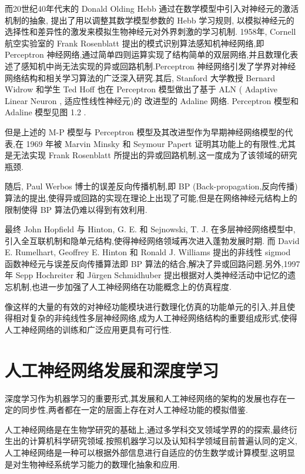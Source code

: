 而20世纪40年代末的 Donald Olding Hebb 通过在数学模型中引入对神经元的激活机制的抽象, 提出了用以调整其数学模型参数的 Hebb 学习规则, 以模拟神经元的选择性和差异性的激发来模拟生物神经元对外界刺激的学习机制. 1958年, Cornell 航空实验室的 Frank Rosenblatt 提出的模式识别算法感知机神经网络,即 Perceptron 神经网络,通过简单四则运算实现了结构简单的双层网络,并且数理化表述了感知机中尚无法实现的异或回路机制.Perceptron 神经网络引发了学界对神经网络结构和相关学习算法的广泛深入研究.其后, Stanford 大学教授 Bernard Widrow 和学生 Ted Hoff 也在 Perceptron 模型做出了基于 ALN ( Adaptive Linear Neuron , 适应性线性神经元)的 改进型的 Adaline 网络. Perceptron 模型和 Adaline 模型见图 1.2 .

但是上述的 M-P 模型与 Perceptron 模型及其改进型作为早期神经网络模型的代表,在 1969 年被 Marvin Minsky 和 Seymour Papert 证明其功能上的有限性,尤其是无法实现 Frank Rosenblatt 所提出的异或回路机制,这一度成为了该领域的研究瓶颈. 

随后, Paul Werbos 博士的误差反向传播机制,即 BP (Back-propagation,反向传播) 算法的提出,使得异或回路的实现在理论上出现了可能,但是在网络神经元结构上的限制使得 BP 算法仍难以得到有效利用.

最终 John Hopfield 与 Hinton, G. E. 和 Sejnowski, T. J. 在多层神经网络模型中,引入全互联机制和隐单元结构,使得神经网络领域再次进入蓬勃发展时期. 而 David E. Rumelhart, Geoffrey E. Hinton 和 Ronald J. Williams 提出的非线性 sigmod 函数神经元与误差反向传播算法即 BP 算法的结合,解决了异或回路问题.另外,1997年 Sepp Hochreiter 和 Jürgen Schmidhuber 提出根据对人类神经活动中记忆的遗忘机制,也进一步加强了人工神经网络在功能概念上的仿真程度.

像这样的大量的有效的对神经功能模块进行数理化仿真的功能单元的引入,并且使得相对复杂的非纯线性多层神经网络,成为人工神经网络结构的重要组成形式,使得人工神经网络的训练和广泛应用更具有可行性.

\section{人工神经网络发展和深度学习}
深度学习作为机器学习的重要形式,其发展和人工神经网络的架构的发展也存在一定的同步性,两者都在一定的层面上存在对人工神经功能的模拟借鉴.

人工神经网络是在生物学研究的基础上,通过多学科交叉领域学界的的探索,最终衍生出的计算机科学研究领域.按照机器学习以及认知科学领域目前普遍认同的定义,人工神经网络是一种可以根据外部信息进行自适应的仿生数学或计算模型,这明显是对生物神经系统学习能力的数理化抽象和应用.

